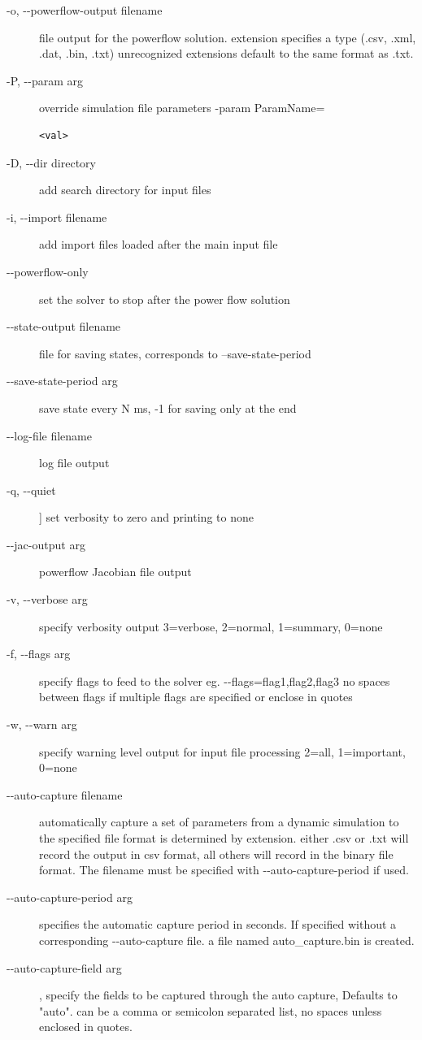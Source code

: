 \documentclass[12pt]{article} %
\begin{document}
	\begin{description}
	\item [-o, -{}-powerflow-output filename]  file output for the powerflow solution.  extension specifies a type (.csv, .xml, .dat, .bin, .txt)  unrecognized extensions default to the same format as .txt.  
	\item [-P, -{}-param arg ]     override simulation file parameters -param ParamName=\begin{verbatim}<val>\end{verbatim}
	\item [-D, -{}-dir directory ]       add search directory for input files
	\item [-i, -{}-import filename ]           add import files loaded after the main input file
	\item [-{}-powerflow-only ]       set the solver to stop after the power flow solution
	\item [-{}-state-output filename ]     file for saving states, corresponds to --save-state-period
	\item [-{}-save-state-period arg] save state every N ms, -1 for saving only at the end
	\item [-{}-log-file filename]       log file output
	\item [ -q, -{}-quiet]  ]         set verbosity to zero and printing to none
	\item [-{}-jac-output arg ]       powerflow Jacobian file output
	\item [-v, -{}-verbose arg ]   specify verbosity output 3=verbose, 2=normal, 
	1=summary, 0=none
	\item [-f, -{}-flags  arg  ]    specify flags to feed to the solver eg. -{}-flags=flag1,flag2,flag3 no spaces between flags if multiple flags are specified or enclose in quotes
	\item [-w, -{}-warn arg ]      specify warning level output for input file processing 2=all, 1=important, 0=none 
	\item [-{}-auto-capture filename]  automatically capture a set of parameters from a dynamic simulation to the specified file format is determined by extension.  either .csv or .txt will record the output in csv format,  all others will record in the binary file format.  The filename must be specified with -{}-auto-capture-period if used.  
	\item [-{}-auto-capture-period  arg ] specifies the automatic capture period in seconds.  If specified without a corresponding -{}-auto-capture file. a file named auto\_capture.bin is created.  
	\item [-{}-auto-capture-field arg],  specify the fields to be captured through the auto capture,  Defaults to "auto".  can be a comma or semicolon separated list,  no spaces unless enclosed in quotes.
\end{description}
\end{document}
